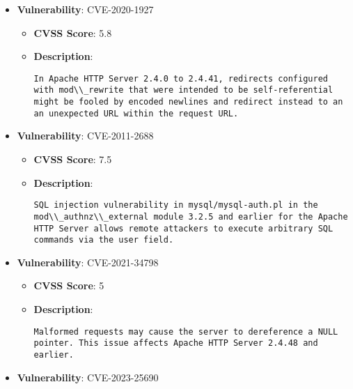 \documentclass{article}
\begin{document}
\begin{itemize}
        \item \textbf{Vulnerability}: CVE-2020-1927
        \begin{itemize}
            \item \textbf{CVSS Score}:  5.8 
            \item \textbf{Description}:
            \parbox[t]{0.9\linewidth}{
                \verb|In Apache HTTP Server 2.4.0 to 2.4.41, redirects configured with mod\\_rewrite that were intended to be self-referential might be fooled by encoded newlines and redirect instead to an an unexpected URL within the request URL.|
            }
        \end{itemize}
    
        \item \textbf{Vulnerability}: CVE-2011-2688
        \begin{itemize}
            \item \textbf{CVSS Score}:  7.5 
            \item \textbf{Description}:
            \parbox[t]{0.9\linewidth}{
                \verb|SQL injection vulnerability in mysql/mysql-auth.pl in the mod\\_authnz\\_external module 3.2.5 and earlier for the Apache HTTP Server allows remote attackers to execute arbitrary SQL commands via the user field.|
            }
        \end{itemize}
    
        \item \textbf{Vulnerability}: CVE-2021-34798
        \begin{itemize}
            \item \textbf{CVSS Score}:  5 
            \item \textbf{Description}:
            \parbox[t]{0.9\linewidth}{
                \verb|Malformed requests may cause the server to dereference a NULL pointer. This issue affects Apache HTTP Server 2.4.48 and earlier.|
            }
        \end{itemize}
    
        \item \textbf{Vulnerability}: CVE-2023-25690
\end{itemize}
\end{document}
